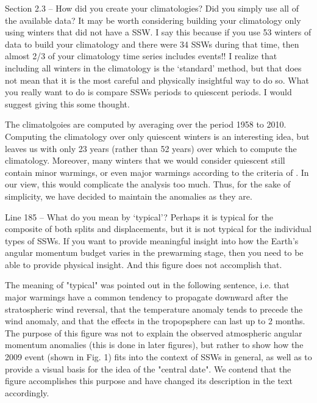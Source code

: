\documentclass[a4paper,10pt]{article}
\begin{document}
\textcolor{reviewer}{Section 2.3 – How did you create your climatologies? Did you simply use all of the
available data? It may be worth considering building your climatology only using winters
that did not have a SSW. I say this because if you use 53 winters of data to build your
climatology and there were 34 SSWs during that time, then almost 2/3 of your
climatology time series includes events!! I realize that including all winters in the
climatology is the ‘standard’ method, but that does not mean that it is the most careful
and physically insightful way to do so. What you really want to do is compare SSWs
periods to quiescent periods. I would suggest giving this some thought.}
\vspace{0.5cm}

The climatolgoies are computed by averaging over the period 1958 to 2010.  
Computing the climatology over only quiescent winters is an interesting idea, but  leaves us with only 23 years (rather than 52 years) over which to compute the climatology.  
Moreover, many winters that we would consider quiescent still contain minor warmings, or even major warmings according to the criteria of \citet{Mitchell2012}.  
In our view, this would complicate the analysis too much.  
Thus, for the sake of simplicity, we have decided to maintain the anomalies as they are.
\vspace{0.5cm}

\textcolor{reviewer}{Line 185 – What do you mean by ‘typical’? Perhaps it is typical for the composite of both
splits and displacements, but it is not typical for the individual types of SSWs. If you
want to provide meaningful insight into how the Earth’s angular momentum budget
varies in the prewarming stage, then you need to be able to provide physical insight. And
this figure does not accomplish that.}
\vspace{0.5cm}

The meaning of "typical" was pointed out in the following sentence, i.e. that major warmings have a common tendency to propagate downward  after the stratospheric wind reversal, that the temperature anomaly tends to precede the wind anomaly, and that the effects in the tropopsphere can last up to 2 months.  The purpose of this figure was not to explain the observed atmospheric angular momentum anomalies (this is done in later figures), but rather to show how the 2009 event (shown in Fig. 1) fits into the context of SSWs in general, as well as to provide a visual basis for the idea of the "central date".  We contend that the figure accomplishes this purpose and have changed its description in the text accordingly. 
\vspace{0.5cm}
\end{document}
